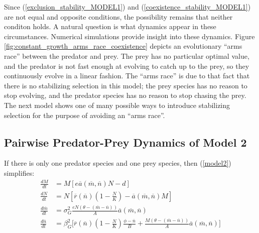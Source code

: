 \documentclass{amsart}
\theoremstyle{definition}
\theoremstyle{remark}
\numberwithin{equation}{section}
\begin{document}
Since (\ref{exclusion_stability_MODEL1}) and (\ref{coexistence_stability_MODEL1}) are not equal and opposite conditions, the possibility remains that neither conditon holds.  A natural question is what dynamics appear in these circumstances.  Numerical simulations provide insight into these dynamics.  Figure \ref{fig:constant_growth_arms_race_coexistence} depicts an evolutionary ``arms race'' between the predator and prey.  The prey has no particular optimal value, and the predator is not fast enough at evolving to catch up to the prey, so they continuously evolve in a linear fashion.  The ``arms race'' is due to that fact that there is no stabilizing selection in this model; the prey species has no reason to stop evolving, and the predator species has no reason to stop chasing the prey.  The next model shows one of many possible ways to introduce stabilizing selection for the purpose of avoiding an ``arms race''.



































\subsection{Pairwise Predator-Prey Dynamics of Model 2}
If there is only one predator species and one prey species, then (\ref{model2}) simplifies:
\begin{subequations}
	\label{MODEL2}
	\begin{align}
		\label{eq:MODEL2_A}
		\frac{dM}{dt} &= M\left[e\overline{a}(\overline{m}, \overline{n})N - d\right] \\[5px]
		\label{eq:MODEL2_B}
		\frac{dN}{dt} &= N\left[\overline{r}(\overline{n})\left(1 - \frac{N}{K}\right) - \overline{a}(\overline{m}, \overline{n})M\right] \\[5px]
		\label{eq:MODEL2_C}
		\frac{d\overline{m}}{dt} &= \sigma_{G}^2\frac{eN(\theta - (\overline{m} - \overline{n}))}{A}\overline{a}(\overline{m}, \overline{n}) \\[5px]
		\label{eq:MODEL2_D}
		\frac{d\overline{n}}{dt} &= \beta_{G}^2\Bigg[\overline{r}(\overline{n})\left(1 - \frac{N}{K}\right)\frac{\phi - \overline{n}}{B} + \frac{M(\theta - (\overline{m} - \overline{n}))}{A}\overline{a}(\overline{m}, \overline{n})\Bigg]
	\end{align}
\end{subequations}
\end{document}
